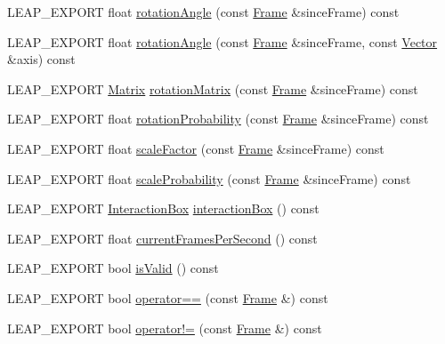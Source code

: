 \begin{DoxyCompactItemize}
\item 
L\+E\+A\+P\+\_\+\+E\+X\+P\+O\+RT float \hyperlink{class_leap_1_1_frame_a0d54882e92aaed1d8be42e316dcdea3a}{rotation\+Angle} (const \hyperlink{class_leap_1_1_frame}{Frame} \&since\+Frame) const
\item 
L\+E\+A\+P\+\_\+\+E\+X\+P\+O\+RT float \hyperlink{class_leap_1_1_frame_af20293cf001ffbdd6d18d2a0704b4eac}{rotation\+Angle} (const \hyperlink{class_leap_1_1_frame}{Frame} \&since\+Frame, const \hyperlink{struct_leap_1_1_vector}{Vector} \&axis) const
\item 
L\+E\+A\+P\+\_\+\+E\+X\+P\+O\+RT \hyperlink{struct_leap_1_1_matrix}{Matrix} \hyperlink{class_leap_1_1_frame_a628403500e883a757b15e50d3130c2a8}{rotation\+Matrix} (const \hyperlink{class_leap_1_1_frame}{Frame} \&since\+Frame) const
\item 
L\+E\+A\+P\+\_\+\+E\+X\+P\+O\+RT float \hyperlink{class_leap_1_1_frame_a8d0951680227a2c75bdccb60c12383b1}{rotation\+Probability} (const \hyperlink{class_leap_1_1_frame}{Frame} \&since\+Frame) const
\item 
L\+E\+A\+P\+\_\+\+E\+X\+P\+O\+RT float \hyperlink{class_leap_1_1_frame_a891200907b954c491432278675c29557}{scale\+Factor} (const \hyperlink{class_leap_1_1_frame}{Frame} \&since\+Frame) const
\item 
L\+E\+A\+P\+\_\+\+E\+X\+P\+O\+RT float \hyperlink{class_leap_1_1_frame_acebab65173cf11a44c6064e1a1cfd01f}{scale\+Probability} (const \hyperlink{class_leap_1_1_frame}{Frame} \&since\+Frame) const
\item 
L\+E\+A\+P\+\_\+\+E\+X\+P\+O\+RT \hyperlink{class_leap_1_1_interaction_box}{Interaction\+Box} \hyperlink{class_leap_1_1_frame_a1c591dacf806716d9c0b11767e77ba48}{interaction\+Box} () const
\item 
L\+E\+A\+P\+\_\+\+E\+X\+P\+O\+RT float \hyperlink{class_leap_1_1_frame_a7171bec9ea419733a69599bfb09cf38d}{current\+Frames\+Per\+Second} () const
\item 
L\+E\+A\+P\+\_\+\+E\+X\+P\+O\+RT bool \hyperlink{class_leap_1_1_frame_a837bf075a6befadf3337ae07ca3b2891}{is\+Valid} () const
\item 
L\+E\+A\+P\+\_\+\+E\+X\+P\+O\+RT bool \hyperlink{class_leap_1_1_frame_a9ce903f44d733d0d27d7dc599c7ca30c}{operator==} (const \hyperlink{class_leap_1_1_frame}{Frame} \&) const
\item 
L\+E\+A\+P\+\_\+\+E\+X\+P\+O\+RT bool \hyperlink{class_leap_1_1_frame_a437502d00cc85def291fbe48222a9644}{operator!=} (const \hyperlink{class_leap_1_1_frame}{Frame} \&) const
\item 

\end{DoxyCompactItemize}
